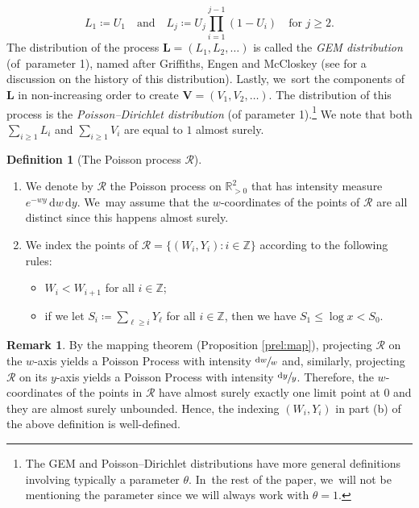 \documentclass[10pt,a4paper]{article}
\newenvironment{enumeratea}
{\bgroup\def\theenumi{\alph{enumi}}\begin{enumerate}}
{\end{enumerate}\egroup}
\newcommand{\bL}{{\boldsymbol L}}
\newcommand{\bV}{{\boldsymbol V}}
\newcommand{\ZZ}{\mathbb{Z}}
\newcommand{\RR}{\mathbb{R}}
\newcommand{\RS}{\mathscr{R}}
\newcommand{\bg}{\big}
\theoremstyle{plain}
\theoremstyle{definition}
\newtheorem{deff}[cor]{Definition}
\newtheorem*{rems}{Remark}
\begin{document}
\[
L_1 \coloneqq U_1 \quad \text{and}\quad L_j \coloneqq U_j \prod_{i=1}^{j-1} (1-U_i) \quad \text{for $j \ge 2$.}
\]
The distribution of the process $\bL = (L_1, L_2, \ldots)$ is called the \textit{GEM distribution} (of~parameter 1), named after Griffiths, Engen and McCloskey (see \cite[Ch.\,41]{JKB} for a discussion on the history of this distribution). Lastly, we~sort the components of $\bL$ in non-increasing order to create $\bV = (V_1, V_2, \ldots)$. The distribution of this process is the \textit{Poisson--Dirichlet distribution} (of parameter 1).\footnote{The GEM and Poisson--Dirichlet distributions have more general definitions involving typically a parameter $\theta$. In~the rest of the paper, we~will not be mentioning the parameter since we will always work with $\theta = 1$.} We note that both $\sum_{i \ge 1} L_i$ and $\sum_{i \ge 1} V_i$ are equal to $1$ almost surely.

\begin{deff}[The Poisson process $\RS$]\label{dfn:Poisson Process R}
\begin{enumeratea}
\item We denote by $\RS$ the Poisson process on $\RR_{>0}^2$ that has intensity measure $e^{-wy}\, \mathrm dw\, \mathrm dy$. We~may assume that the $w$-coordinates of the points of $\RS$ are all distinct since this happens almost surely.
\item We index the points of $\RS = \bg\{(W_i, Y_i) : i \in\ZZ\bg\}$ according to the following rules:
\begin{itemize}
\item $W_i < W_{i+1}$ for all $i\in\ZZ$;
\item if we let $S_i\coloneqq \sum_{\ell \ge i} Y_\ell$ for all $i\in\ZZ$, then we have $S_1 \le \log x < S_0$.
\end{itemize}
\end{enumeratea}
\end{deff}

\begin{rems}
By the mapping theorem (Proposition \ref{prel:map}), projecting $\RS$ on the $w$-axis yields a Poisson Process with intensity $\sfrac{\mathrm dw}{w}$ and, similarly, projecting $\RS$ on its $y$\nobreakdash-axis yields a Poisson Process with intensity $\sfrac{\mathrm dy}{y}$. Therefore, the $w$-coordinates of the points in $\RS$ have almost surely exactly one limit point at $0$ and they are almost surely unbounded. Hence, the indexing $(W_i,Y_i)$ in part (b) of the above definition is well-defined.
\end{rems}
\end{document}
